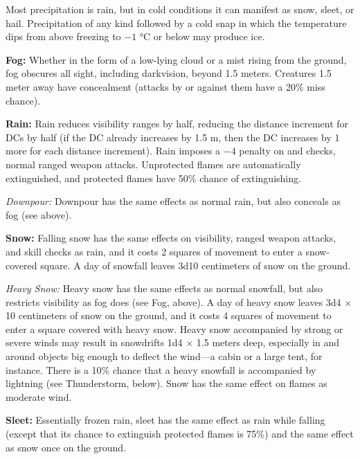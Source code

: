 Most precipitation is rain, but in cold conditions it can manifest as snow, sleet, or hail. Precipitation of any kind followed by a cold snap in which the temperature dips from above freezing to $-1$ °C or below may produce ice.

\textbf{Fog:} Whether in the form of a low-lying cloud or a mist rising from the ground, fog obscures all sight, including darkvision, beyond 1.5 meters. Creatures 1.5 meter away have concealment (attacks by or against them have a 20\% miss chance).

\textbf{Rain:} Rain reduces visibility ranges by half, reducing the distance increment for  DCs by half (if the DC already increases by 1.5 m, then the DC increases by 1 more for each distance increment). Rain imposes a $-4$ penalty on  and  checks, normal ranged weapon attacks. Unprotected flames are automatically extinguished, and protected flames have 50\% chance of extinguishing.%

\textit{Downpour:} Downpour has the same effects as normal rain, but also conceals as fog (see above).

\textbf{Snow:} Falling snow has the same effects on visibility, ranged weapon attacks, and skill checks as rain, and it costs 2 squares of movement to enter a snow-covered square. A day of snowfall leaves 3d10 centimeters of snow on the ground.

\textit{Heavy Snow:} Heavy snow has the same effects as normal snowfall, but also restricts visibility as fog does (see Fog, above). A day of heavy snow leaves 3d4 $\times$ 10 centimeters of snow on the ground, and it costs 4 squares of movement to enter a square covered with heavy snow. Heavy snow accompanied by strong or severe winds may result in snowdrifts 1d4 $\times$ 1.5 meters deep, especially in and around objects big enough to deflect the wind---a cabin or a large tent, for instance. There is a 10\% chance that a heavy snowfall is accompanied by lightning (see Thunderstorm, below). Snow has the same effect on flames as moderate wind.

\textbf{Sleet:} Essentially frozen rain, sleet has the same effect as rain while falling (except that its chance to extinguish protected flames is 75\%) and the same effect as snow once on the ground.


